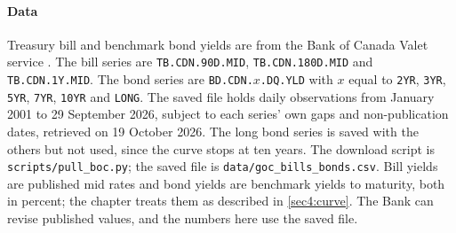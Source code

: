 \begin{chapterrefs}
\paragraph{Data}
Treasury bill and benchmark bond yields are from the Bank of Canada Valet service
\parencite{bocvalet}. The bill series are \texttt{TB.CDN.90D.MID}, \texttt{TB.CDN.180D.MID} and
\texttt{TB.CDN.1Y.MID}. The bond series are \texttt{BD.CDN.$x$.DQ.YLD} with $x$ equal to
\texttt{2YR}, \texttt{3YR}, \texttt{5YR}, \texttt{7YR}, \texttt{10YR} and \texttt{LONG}. The saved file
holds daily observations from January 2001 to 29 September 2026, subject to each series' own gaps
and non-publication dates, retrieved on 19 October 2026. The long bond series is saved with the others
but not used, since the curve stops at ten years. The
download script is \texttt{scripts/pull\_boc.py}; the saved file is \texttt{data/goc\_bills\_bonds.csv}.
Bill yields
are published mid rates and bond yields are benchmark yields to maturity, both in percent; the chapter
treats them as described in \cref{sec4:curve}. The Bank can revise published values, and the numbers
here use the saved file.

\end{chapterrefs}
